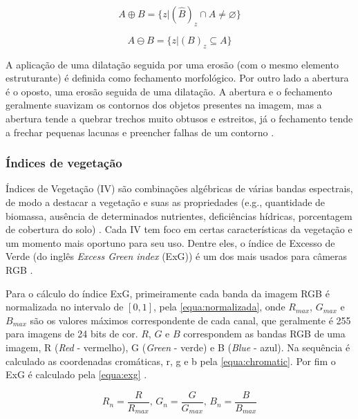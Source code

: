 \documentclass[12pt, a4paper, english, brazil]{article}
\begin{document}
\begin{equation}
    A \oplus B = \{z | (\hat{B})_z \cap A \neq \varnothing \}
    \label{equa:dilatacao}
\end{equation}

\begin{equation}
    A \ominus B = \{ z | (B)_z \subseteq A\}
    \label{equa:erosao}
\end{equation}

A aplicação de uma dilatação seguida por uma erosão (com o mesmo elemento estruturante) é definida como fechamento morfológico. Por outro lado a abertura é o oposto, uma erosão seguida de uma dilatação. A abertura e o fechamento geralmente suavizam os contornos dos objetos presentes na imagem, mas a abertura tende a quebrar trechos muito obtusos e estreitos, já o fechamento tende a frechar pequenas lacunas e preencher falhas de um contorno \cite{Gonzalez_Woods_2010, Kaur_Sahambi_2015}.

\subsubsection{Índices de vegetação}

Índices de Vegetação (IV) são combinações algébricas de várias bandas espectrais, de modo a destacar a vegetação e suas as propriedades (e.g., quantidade de biomassa, ausência de determinados nutrientes, deficiências hídricas, porcentagem de cobertura do solo) \cite{Candiago_2015}. Cada IV tem foco em certas características da vegetação e um momento mais oportuno para seu uso. Dentre eles, o índice de Excesso de Verde (do inglês \textit{Excess Green index} (ExG)) é um dos mais usados para câmeras RGB \cite{Pereira_Junior_2020}. 

Para o cálculo do índice ExG, primeiramente cada banda da imagem RGB é normalizada no intervalo de $[0, 1]$, pela \autoref{equa:normalizada}, onde $R_{max}$, $G_{max}$ e $B_{max}$ são os valores máximos correspondente de cada canal, que geralmente é 255 para imagens de 24 bits de cor. $R$, $G$ e $B$ correspondem as bandas RGB de uma imagem, R (\textit{Red} - vermelho),  G (\textit{Green} - verde) e B (\textit{Blue} - azul). Na sequência é calculado as coordenadas cromáticas, r, g e b pela \autoref{equa:chromatic}. Por fim o ExG é calculado pela \autoref{equa:exg} \cite{Garcia_2017}.

\begin{equation}
    R_n = \frac{R}{R_{max}} \text{, } G_n = \frac{G}{G_{max}} \text{, } B_n = \frac{B}{B_{max}}
    \label{equa:normalizada}
\end{equation}
\end{document}
